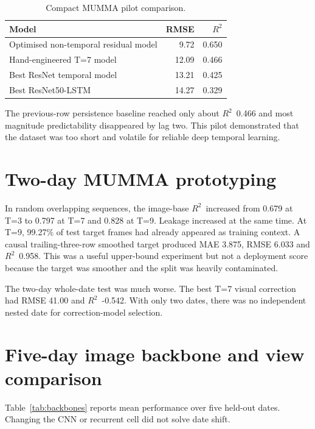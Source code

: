 \documentclass[11pt,a4paper,oneside]{report}
\newcommand{\Rtwo}{$R^2$}
\begin{document}
\begin{table}[H]
  \centering
  \caption{Compact MUMMA pilot comparison.}
  \begin{tabular}{lrr}
    \toprule
    Model & RMSE & \Rtwo\\
    \midrule
    Optimised non-temporal residual model & 9.72 & 0.650\\
    Hand-engineered T=7 model & 12.09 & 0.466\\
    Best ResNet temporal model & 13.21 & 0.425\\
    Best ResNet50-LSTM & 14.27 & 0.329\\
    \bottomrule
  \end{tabular}
\end{table}

The previous-row persistence baseline reached only about \Rtwo\ 0.466 and most
magnitude predictability disappeared by lag two. This pilot demonstrated that
the dataset was too short and volatile for reliable deep temporal learning.

\section{Two-day MUMMA prototyping}
In random overlapping sequences, the image-base \Rtwo\ increased from 0.679 at
T=3 to 0.797 at T=7 and 0.828 at T=9. Leakage increased at the same time. At
T=9, 99.27\% of test target frames had already appeared as training context. A
causal trailing-three-row smoothed target produced MAE 3.875, RMSE 6.033 and
\Rtwo\ 0.958. This was a useful upper-bound experiment but not a deployment
score because the target was smoother and the split was heavily contaminated.

The two-day whole-date test was much worse. The best T=7 visual correction had
RMSE 41.00 and \Rtwo\ -0.542. With only two dates, there was no independent
nested date for correction-model selection.

\section{Five-day image backbone and view comparison}
Table~\ref{tab:backbones} reports mean performance over five held-out dates.
Changing the CNN or recurrent cell did not solve date shift.
\end{document}
